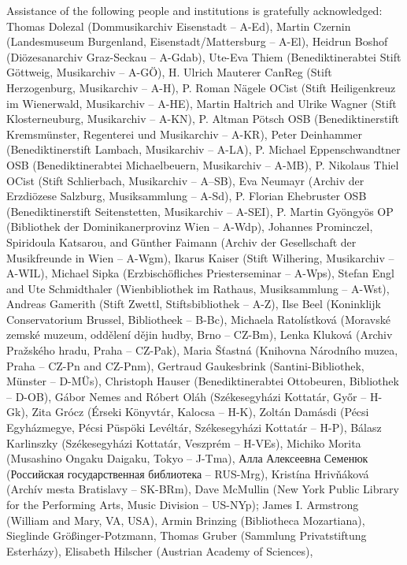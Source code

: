 \documentclass{ees}
\begin{document}
Assistance of the following people and institutions is gratefully acknowledged:
Thomas Dolezal (Dommusikarchiv Eisenstadt – A-Ed),
Martin Czernin (Landesmuseum Burgenland, Eisenstadt/Mattersburg – A-El),
Heidrun Boshof (Diözesanarchiv Graz-Seckau – A-Gdab),
Ute-Eva Thiem (Benediktinerabtei Stift Göttweig, Musikarchiv – A-GÖ),
H. Ulrich Mauterer CanReg (Stift Herzogenburg, Musikarchiv – A-H),
P. Roman Nägele OCist (Stift Heiligenkreuz im Wienerwald, Musikarchiv – A-HE),
Martin Haltrich and Ulrike Wagner (Stift Klosterneuburg, Musikarchiv – A-KN),
P. Altman Pötsch OSB (Benediktinerstift Kremsmünster, Regenterei und Musikarchiv – A-KR),
Peter Deinhammer (Benediktinerstift Lambach, Musikarchiv – A-LA),
P. Michael Eppenschwandtner OSB (Benediktinerabtei Michaelbeuern, Musikarchiv – A-MB),
P. Nikolaus Thiel OCist (Stift Schlierbach, Musikarchiv – A–SB),
Eva Neumayr (Archiv der Erzdiözese Salzburg, Musiksammlung – A-Sd),
P. Florian Ehebruster OSB (Benediktinerstift Seitenstetten, Musikarchiv – A-SEI),
P. Martin Gyöngyös OP (Bibliothek der Dominikanerprovinz Wien – A-Wdp),
Johannes Prominczel, Spiridoula Katsarou, and Günther Faimann (Archiv der Gesellschaft der Musikfreunde in Wien – A-Wgm),
Ikarus Kaiser (Stift Wilhering, Musikarchiv – A-WIL),
Michael Sipka (Erzbischöfliches Priesterseminar – A-Wps),
Stefan Engl and Ute Schmidthaler (Wienbibliothek im Rathaus, Musiksammlung – A-Wst),
Andreas Gamerith (Stift Zwettl, Stiftsbibliothek – A-Z),
Ilse Beel (Koninklijk Conservatorium Brussel, Bibliotheek – B-Bc),
Michaela Ratolístková (Moravské zemské muzeum, oddělení dějin hudby, Brno  – CZ-Bm),
Lenka Kluková (Archiv Pražského hradu, Praha – CZ-Pak),
Maria Šťastná (Knihovna Národního muzea, Praha – CZ-Pn and CZ-Pnm),
Gertraud Gaukesbrink (Santini-Bibliothek, Münster – D-MÜs),
Christoph Hauser (Benediktinerabtei Ottobeuren, Bibliothek – D-OB),
Gábor Nemes and Róbert Oláh (Székesegyházi Kottatár, Győr – H-Gk),
Zita Grócz (Érseki Könyvtár, Kalocsa – H-K),
Zoltán Damásdi (Pécsi Egyházmegye, Pécsi Püspöki Levéltár, Székesegyházi Kottatár – H-P),
Bálasz Karlinszky (Székesegyházi Kottatár, Veszprém – H-VEs),
Michiko Morita (Musashino Ongaku Daigaku, Tokyo – J-Tma),
Алла Алексеевна Семенюк (Российская государственная библиотека – RUS-Mrg),
Kristína Hrivňáková (Archív mesta Bratislavy – SK-BRm),
Dave McMullin (New York Public Library for the Performing Arts, Music Division – US-NYp);
James I. Armstrong (William and Mary, VA, USA),
Armin Brinzing (Bibliotheca Mozartiana),
Sieglinde Größinger-Potzmann,
Thomas Gruber (Sammlung Privatstiftung Esterházy),
Elisabeth Hilscher (Austrian Academy of Sciences),
\end{document}
